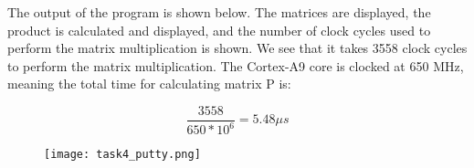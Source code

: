 \documentclass[../main.tex]{subfiles}
\begin{document}
\newpage

The output of the program is shown below. The matrices are displayed, the product is calculated and displayed, and the number of clock cycles used to perform the matrix multiplication is shown. We see that it takes 3558 clock cycles to perform the matrix multiplication. The Cortex-A9 core is clocked at 650 MHz, meaning the total time for calculating matrix P is:

$$ \frac{3558}{650 * 10^6} = 5.48 \mu s $$

\begin{figure}[h]
    \centering
    \texttt{[image: task4\_putty.png]}
\end{figure}
\end{document}
